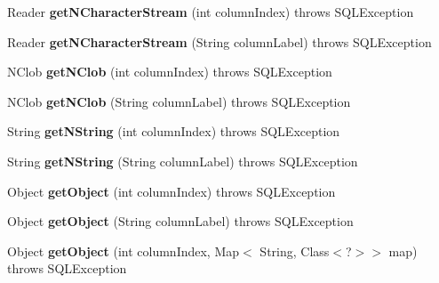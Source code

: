 \begin{DoxyCompactItemize}
Reader {\bfseries get\+N\+Character\+Stream} (int column\+Index)  throws S\+Q\+L\+Exception 
\item 
\mbox{\label{classsimpledb_1_1jdbc_1_1ResultSetAdapter_ae870b6168aa1becc31e41ceccbe70bdd}} 
Reader {\bfseries get\+N\+Character\+Stream} (String column\+Label)  throws S\+Q\+L\+Exception 
\item 
\mbox{\label{classsimpledb_1_1jdbc_1_1ResultSetAdapter_ac0cac7617a02a56caca1d5ac7653e1e1}} 
N\+Clob {\bfseries get\+N\+Clob} (int column\+Index)  throws S\+Q\+L\+Exception 
\item 
\mbox{\label{classsimpledb_1_1jdbc_1_1ResultSetAdapter_a00ce1c35a26d401301f513f8ca9260bd}} 
N\+Clob {\bfseries get\+N\+Clob} (String column\+Label)  throws S\+Q\+L\+Exception 
\item 
\mbox{\label{classsimpledb_1_1jdbc_1_1ResultSetAdapter_a73773a8c5e691eb9ef37830395090249}} 
String {\bfseries get\+N\+String} (int column\+Index)  throws S\+Q\+L\+Exception 
\item 
\mbox{\label{classsimpledb_1_1jdbc_1_1ResultSetAdapter_a5a2d67e238b8aaf8b36005c0e9ae6019}} 
String {\bfseries get\+N\+String} (String column\+Label)  throws S\+Q\+L\+Exception 
\item 
\mbox{\label{classsimpledb_1_1jdbc_1_1ResultSetAdapter_aa40bdb305dcfc4bce886417dfed94cee}} 
Object {\bfseries get\+Object} (int column\+Index)  throws S\+Q\+L\+Exception 
\item 
\mbox{\label{classsimpledb_1_1jdbc_1_1ResultSetAdapter_a6bb492f2e695016ff188a9e8acd964be}} 
Object {\bfseries get\+Object} (String column\+Label)  throws S\+Q\+L\+Exception 
\item 
\mbox{\label{classsimpledb_1_1jdbc_1_1ResultSetAdapter_a6f81ff2f85de323577ed430e031e6eaf}} 
Object {\bfseries get\+Object} (int column\+Index, Map$<$ String, Class$<$?$>$$>$ map)  throws S\+Q\+L\+Exception 
$$
\end{DoxyCompactItemize}
